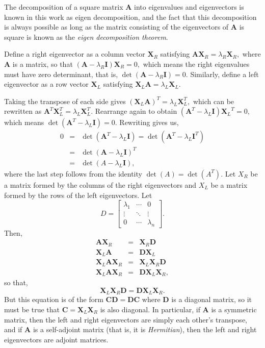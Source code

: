 The decomposition of a square matrix $\mathbf{A}$ into eigenvalues and eigenvectors is known in this work as eigen decomposition, and the fact that this decomposition is always possible as long as the matrix consisting of the eigenvectors of $\mathbf{A}$ is square is known as the \emph{eigen decomposition theorem}. 

Define a right eigenvector as a column vector $\mathbf{X}_R$ satisfying $\mathbf{AX}_R=\lambda_R \mathbf{X}_R,$ where $\mathbf{A}$ is a matrix, so that
$(\mathbf{A}-\lambda_R \mathbf{I})\mathbf{X}_R=0,$ which means the right eigenvalues must have zero determinant, that is, 
$\det(\mathbf{A}-\lambda_R \mathbf{I})=0$. Similarly, define a left eigenvector as a row vector $\mathbf{X}_L$ satisfying $\mathbf{X}_L \mathbf{A}=\lambda_L \mathbf{X}_L.$

Taking the transpose of each side gives $(\mathbf{X}_L \mathbf{A})^T=\lambda_L \mathbf{X}_L^T,$ which can be rewritten as $\mathbf{A}^T \mathbf{X}_L^T=\lambda_L \mathbf{X}_L^T.$ Rearrange again to obtain $(\mathbf{A}^T-\lambda_L \mathbf{I}){\mathbf{X}_L}^T=0,$ which means
$\det(\mathbf{A}^T-\lambda_L \mathbf{I})=0.$ Rewriting gives us,
\begin{eqnarray*}
0&=& \det(\mathbf{A}^T-\lambda_L \mathbf{I}) = \det(\mathbf{A}^T-\lambda_L \mathbf{I}^T) \\
 &=& \det(\mathbf{A}-\lambda_L \mathbf{I})^T \\
 &=& \det(A-\lambda_L \mathbf{I}),
\end{eqnarray*}
where the last step follows from the identity $\det(A)=\det(A^T)$. Let $X_R$ be a matrix  formed by the columns of the right eigenvectors and $X_L$ be a matrix formed by the rows of the left eigenvectors. Let 
\[
D=
\begin{bmatrix}
	\lambda_1 & \cdots & 0 \\
	\vdots & \ddots & \vdots \\
	0 & \cdots & \lambda_n
\end{bmatrix}
. 
\]
Then,
\begin{eqnarray*}
\mathbf{AX}_R&=&\mathbf{X}_R \mathbf{D}\\
\mathbf{X}_L \mathbf{A}&=&\mathbf{D} \mathbf{X}_L \\
\mathbf{X}_L \mathbf{AX}_R &=& \mathbf{X}_L \mathbf{X}_R \mathbf{D} \\
\mathbf{X}_L \mathbf{AX}_R &=& \mathbf{DX}_L \mathbf{X}_R,
\end{eqnarray*}
so that,
\[
\mathbf{X}_L \mathbf{X}_R \mathbf{D}=\mathbf{D} \mathbf{X}_L \mathbf{X}_R.
\]
But this equation is of the form $\mathbf{CD}= \mathbf{DC}$ where $\mathbf{D}$ is a diagonal matrix, so it must be true that $\mathbf{C=X}_L \mathbf{X}_R$ is also diagonal. In particular, if $\mathbf{A}$ is a symmetric matrix, then the left and right eigenvectors are simply each other's transpose, and if $\mathbf{A}$ is a self-adjoint matrix (that is, it is \emph{Hermitian}), then the left and right eigenvectors are adjoint matrices.

